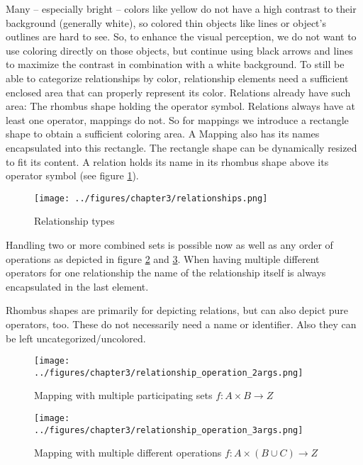 \documentclass[twoside, openright, 12pt]{book}
\begin{document}
Many -- especially bright -- colors like yellow do not have a high contrast to their background (generally white), so colored thin objects like lines or object's outlines are hard to see.
So, to enhance the visual perception, we do not want to use coloring directly on those objects, but continue using black arrows and lines to maximize the contrast in combination with a white background.
To still be able to categorize relationships by color, relationship elements need a sufficient enclosed area that can properly represent its color.
Relations already have such area: The rhombus shape holding the operator symbol.
Relations always have at least one operator, mappings do not.
So for mappings we introduce a rectangle shape to obtain a sufficient coloring area.
A Mapping also has its names encapsulated into this rectangle.
The rectangle shape can be dynamically resized to fit its content.
A relation holds its name in its rhombus shape above its operator symbol (see figure \ref{fig:relationships}).

\begin{figure}[htb]
	\centering
	\texttt{[image: ../figures/chapter3/relationships.png]}
	\caption{Relationship types}
	\label{fig:relationships}
\end{figure}

\noindent
Handling two or more combined sets is possible now as well as any order of operations as depicted in figure \ref{fig:relationship_operation_2args} and \ref{fig:relationship_operation_3args}.
When having multiple different operators for one relationship the name of the relationship itself is always encapsulated in the last element.

Rhombus shapes are primarily for depicting relations, but can also depict pure operators, too.
These do not necessarily need a name or identifier.
Also they can be left uncategorized/uncolored.

\begin{figure}[!htb]
	\centering
	\texttt{[image: ../figures/chapter3/relationship\_operation\_2args.png]}
	\caption{Mapping with multiple participating sets $f:A \times B \rightarrow Z$}
	\label{fig:relationship_operation_2args}
\end{figure}

\begin{figure}[!htb]
	\centering
	\texttt{[image: ../figures/chapter3/relationship\_operation\_3args.png]}
	\caption{Mapping with multiple different operations $f:A \times ( B \cup C ) \rightarrow Z$ }
	\label{fig:relationship_operation_3args}
\end{figure}
\end{document}
